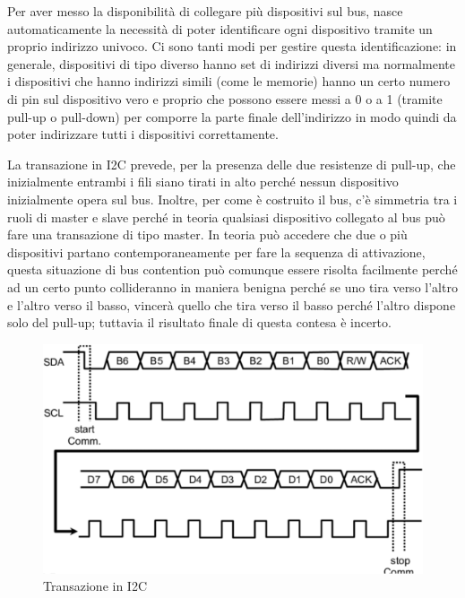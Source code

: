 \documentclass[12pt, a4paper]{report}
\begin{document}
Per aver messo la disponibilità di collegare più dispositivi sul bus, nasce automaticamente la necessità di poter identificare ogni dispositivo tramite un proprio indirizzo univoco. Ci sono tanti modi per gestire questa identificazione: in generale, dispositivi di tipo diverso hanno set di indirizzi diversi ma normalmente i dispositivi che hanno indirizzi simili (come le memorie) hanno un certo numero di pin sul dispositivo vero e proprio che possono essere messi a 0 o a 1 (tramite pull-up o pull-down) per comporre la parte finale dell'indirizzo in modo quindi da poter indirizzare tutti i dispositivi correttamente.

La transazione in I2C prevede, per la presenza delle due resistenze di pull-up, che inizialmente entrambi i fili siano tirati in alto perché nessun dispositivo inizialmente opera sul bus. Inoltre, per come è costruito il bus, c'è simmetria tra i ruoli di master e slave perché in teoria qualsiasi dispositivo collegato al bus può fare una transazione di tipo master. In teoria può accedere che due o più dispositivi partano contemporaneamente per fare la sequenza di attivazione, questa situazione di bus contention può comunque essere risolta facilmente perché ad un certo punto collideranno in maniera benigna perché se uno tira verso l'altro e l'altro verso il basso, vincerà quello che tira verso il basso perché l'altro dispone solo del pull-up; tuttavia il risultato finale di questa contesa è incerto.
\begin{figure}[h]
    \centering
    \includegraphics[scale=0.4,angle=0]{i2c2.png}
    \caption{Transazione in I2C}
\end{figure}
\end{document}
